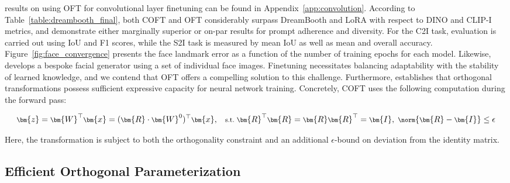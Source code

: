 {results on using OFT for convolutional layer finetuning can be found in Appendix~\ref{app:convolution}. According to Table~\ref{table:dreambooth_final}, both COFT and OFT considerably surpass DreamBooth and LoRA with respect to DINO and CLIP-I metrics, and demonstrate either marginally superior or on-par results for prompt adherence and diversity. For the C2I task, evaluation is carried out using IoU and F1 scores, while the S2I task is measured by mean IoU as well as mean and overall accuracy. Figure~\ref{fig:face_convergence} presents the face landmark error as a function of the number of training epochs for each model. Likewise,~\cite{nitzan2022mystyle} develops a bespoke facial generator using a set of individual face images. Finetuning necessitates balancing adaptability with the stability of learned knowledge, and we contend that OFT offers a compelling solution to this challenge. Furthermore, \cite{liu2021orthogonal} establishes that orthogonal transformations possess sufficient expressive capacity for neural network training. Concretely, COFT uses the following computation during the forward pass:

\begin{equation}\label{eq:coft_general}
    \footnotesize
    \bm{z} = \bm{W}^\top \bm{x} = (\bm{R} \cdot \bm{W}^0)^\top \bm{x}, ~~~ \text{s.t.}~ \bm{R}^\top \bm{R} = \bm{R} \bm{R}^\top = \bm{I}, ~ \norm{\bm{R} - \bm{I}} \leq \epsilon
\end{equation}

Here, the transformation is subject to both the orthogonality constraint and an additional $\epsilon$-bound on deviation from the identity matrix. \subsection{Efficient Orthogonal Parameterization}\label{sect:eff_ortho}

}
